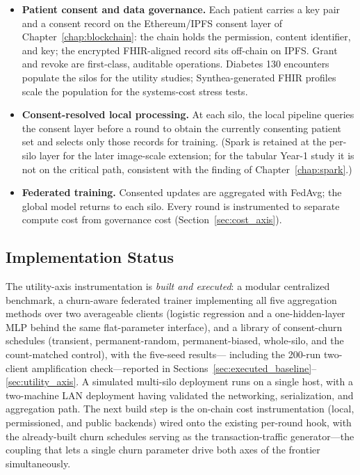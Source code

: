 \documentclass[12pt]{report}
\begin{document}
\begin{itemize}
    \item \textbf{Patient consent and data governance.} Each patient carries a
    key pair and a consent record on the
    Ethereum/IPFS consent layer of Chapter~\ref{chap:blockchain}: the chain holds
    the permission, content identifier, and key; the encrypted FHIR-aligned record
    sits off-chain on IPFS. Grant and revoke are first-class, auditable
    operations. Diabetes 130 encounters populate the silos for the utility
    studies; Synthea-generated FHIR profiles scale the population for the
    systems-cost stress tests.
    \item \textbf{Consent-resolved local processing.} At each silo, the local
    pipeline queries the consent layer before a round to obtain the currently
    consenting patient set and selects only those records for training. (Spark is
    retained at the per-silo layer for the later image-scale extension; for the
    tabular Year-1 study it is not on the critical path, consistent with the
    finding of Chapter~\ref{chap:spark}.)
    \item \textbf{Federated training.} Consented updates are aggregated with
    FedAvg; the global model returns to each silo. Every round is instrumented to
    separate compute cost from governance cost (Section~\ref{sec:cost_axis}).
\end{itemize}

\subsection{Implementation Status}
The utility-axis instrumentation is \emph{built and executed}: a modular
centralized benchmark, a churn-aware federated trainer implementing all five
aggregation methods over two averageable clients (logistic regression and a
one-hidden-layer MLP behind the same flat-parameter interface), and a library
of consent-churn schedules (transient, permanent-random, permanent-biased,
whole-silo, and the count-matched control), with the five-seed results---%
including the 200-run two-client amplification check---reported in
Sections~\ref{sec:executed_baseline}--\ref{sec:utility_axis}. A simulated
multi-silo deployment runs on a single host, with a two-machine LAN deployment
having validated the networking, serialization, and aggregation path. The next
build step is the on-chain cost instrumentation (local, permissioned, and public
backends) wired onto the existing per-round hook, with the already-built churn
schedules serving as the transaction-traffic generator---the coupling that lets
a single churn parameter drive both axes of the frontier simultaneously.
\end{document}
